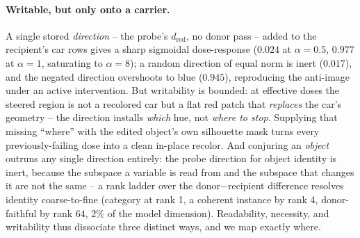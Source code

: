 \paragraph{Writable, but only onto a carrier.} A single stored
\emph{direction} -- the probe's $d_{\text{red}}$, no donor pass -- added to
the recipient's car rows gives a sharp sigmoidal dose-response ($0.024$ at
$\alpha{=}0.5$, $0.977$ at $\alpha{=}1$, saturating to $\alpha{=}8$); a
random direction of equal norm is inert ($0.017$), and the negated
direction overshoots to blue ($0.945$), reproducing the anti-image under
an active intervention. But writability is bounded: at effective doses the
steered region is not a recolored car but a flat red patch that
\emph{replaces} the car's geometry -- the direction installs \emph{which}
hue, not \emph{where to stop}. Supplying that missing ``where'' with the
edited object's own silhouette mask turns every previously-failing dose
into a clean in-place recolor. And conjuring an \emph{object} outruns any
single direction entirely: the probe direction for object identity is
inert, because the subspace a variable is read from and the subspace that
changes it are not the same -- a rank ladder over the donor$-$recipient
difference resolves identity coarse-to-fine (category at rank 1, a
coherent instance by rank 4, donor-faithful by rank 64, $2\%$ of the model
dimension). Readability, necessity, and writability thus dissociate three
distinct ways, and we map exactly where.
